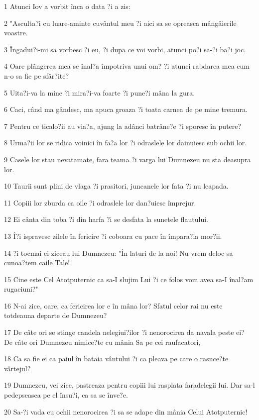 \par 1 Atunci Iov a vorbit înca o data ?i a zis:
\par 2 "Asculta?i cu luare-aminte cuvântul meu ?i aici sa se opreasca mângâierile voastre.
\par 3 Îngadui?i-mi sa vorbesc ?i eu, ?i dupa ce voi vorbi, atunci po?i sa-?i ba?i joc.
\par 4 Oare plângerea mea se înal?a împotriva unui om? ?i atunci rabdarea mea cum n-o sa fie pe sfâr?ite?
\par 5 Uita?i-va la mine ?i mira?i-va foarte ?i pune?i mâna la gura.
\par 6 Caci, când ma gândesc, ma apuca groaza ?i toata carnea de pe mine tremura.
\par 7 Pentru ce ticalo?ii au via?a, ajung la adânci batrâne?e ?i sporesc în putere?
\par 8 Urma?ii lor se ridica voinici în fa?a lor ?i odraslele lor dainuiesc sub ochii lor.
\par 9 Casele lor stau nevatamate, fara teama ?i varga lui Dumnezeu nu sta deasupra lor.
\par 10 Taurii sunt plini de vlaga ?i prasitori, juncanele lor fata ?i nu leapada.
\par 11 Copiii lor zburda ca oile ?i odraslele lor dan?uiesc împrejur.
\par 12 Ei cânta din toba ?i din harfa ?i se desfata la sunetele flautului.
\par 13 Î?i ispravesc zilele în fericire ?i coboara cu pace în împara?ia mor?ii.
\par 14 ?i tocmai ei ziceau lui Dumnezeu: "În laturi de la noi! Nu vrem deloc sa cunoa?tem caile Tale!
\par 15 Cine este Cel Atotputernic ca sa-I slujim Lui ?i ce folos vom avea sa-I înal?am rugaciuni?"
\par 16 N-ai zice, oare, ca fericirea lor e în mâna lor? Sfatul celor rai nu este totdeauna departe de Dumnezeu?
\par 17 De câte ori se stinge candela nelegiui?ilor ?i nenorocirea da navala peste ei? De câte ori Dumnezeu nimice?te cu mânia Sa pe cei raufacatori,
\par 18 Ca sa fie ei ca paiul în bataia vântului ?i ca pleava pe care o rasuce?te vârtejul?
\par 19 Dumnezeu, vei zice, pastreaza pentru copiii lui rasplata faradelegii lui. Dar sa-l pedepseasca pe el însu?i, ca sa se înve?e.
\par 20 Sa-?i vada cu ochii nenorocirea ?i sa se adape din mânia Celui Atotputernic!

